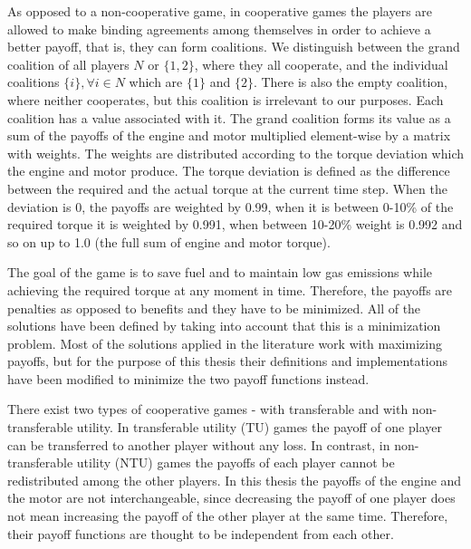 As opposed to a non-cooperative game, in cooperative games the players are allowed to make binding agreements among themselves in order to achieve a better payoff, that is, they can form coalitions. We distinguish between the grand coalition of all players $N$ or $\{1,2\}$, where they all cooperate, and the individual coalitions $\{i\}, \forall i \in N$ which are $\{1\}$ and $\{2\}$. There is also the empty coalition, where neither cooperates, but this coalition is irrelevant to our purposes. Each coalition has a value associated with it. The grand coalition forms its value as a sum of the payoffs of the engine and motor multiplied element-wise by a matrix with weights. The weights are distributed according to the torque deviation which the engine and motor produce. The torque deviation is defined as the difference between the required and the actual torque at the current time step. When the deviation is 0, the payoffs are weighted by 0.99, when it is between 0-10\% of the required torque it is weighted by 0.991, when between 10-20\% weight is 0.992 and so on up to 1.0 (the full sum of engine and motor torque).


The goal of the game is to save fuel and to maintain low gas emissions while achieving the required torque at any moment in time. Therefore, the payoffs are penalties as opposed to benefits and they have to be minimized. All of the solutions have been defined by taking into account that this is a minimization problem. Most of the solutions applied in the literature work with maximizing payoffs, but for the purpose of this thesis their definitions and implementations have been modified to minimize the two payoff functions instead. 


There exist two types of cooperative games - with transferable and with non-transferable utility. In transferable utility (TU) games the payoff of one player can be transferred to another player without any loss. In contrast, in non-transferable utility (NTU) games the payoffs of each player cannot be redistributed among the other players. In this thesis the payoffs of the engine and the motor are not interchangeable, since decreasing the payoff of one player does not mean increasing the payoff of the other player at the same time. Therefore, their payoff functions are thought to be independent from each other.

